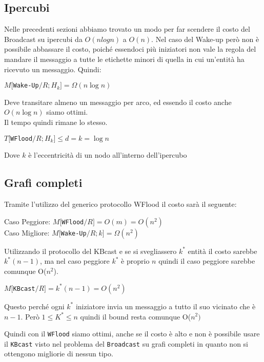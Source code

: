 \subsection{Ipercubi}
Nelle precedenti sezioni abbiamo trovato un modo per far scendere il costo del
Broadcast su ipercubi da $O(nlogn)$ a $O(n)$. Nel caso del Wake-up però non è
possibile abbassare il costo, poiché essendoci più iniziatori non vale la regola
del mandare il messaggio a tutte le etichette minori di quella in cui un'entità
ha ricevuto un messaggio. Quindi:
\begin{center}
    $M[$\texttt{Wake-Up}$/R;H_k] = \Omega(n \log n)$ \\
\end{center}
Deve transitare almeno un messaggio per arco, ed essendo il costo anche $O(n
    \log n)$ siamo ottimi.\\
Il tempo quindi rimane lo stesso.
\begin{center}
    $T[$\texttt{WFlood}$/R;H_k] \leq d = k = \log n$ \\
\end{center}
Dove $k$ è l'eccentricità di un nodo all'interno dell'ipercubo

\subsection{Grafi completi}
Tramite l'utilizzo del generico protocollo WFlood il costo sarà il seguente:
\begin{center}
    Caso Peggiore: $M[$\texttt{WFlood}$/R] = O(m) = O(n^2)$ \\
    Caso Migliore: $M[$\texttt{Wake-Up}$/R;k] = \Omega(n^2)$
\end{center}
Utilizzando il protocollo del KBcast e se si svegliassero $k^*$ entità il costo
sarebbe $k^*(n-1)$, ma nel caso peggiore $k^*$ è proprio $n$ quindi il caso
peggiore sarebbe comunque O($n^2$).
\begin{center}
    $M[$\texttt{KBcast}$/R] = k^*(n-1) = O(n^2)$
\end{center}
Questo perché ogni $k^*$ iniziatore invia un messaggio a tutto il suo vicinato
che è $n-1$. Però $1\leq K^* \leq n$ quindi il bound resta comunque O($n^2)$

Quindi con il \texttt{WFlood} siamo ottimi, anche se il costo è alto e non è
possibile usare il \texttt{KBcast} visto nel problema del \texttt{Broadcast} su
grafi completi in quanto non si ottengono migliorie di nessun tipo.

